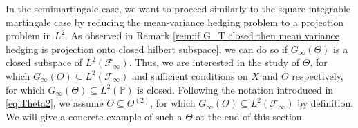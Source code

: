 \documentclass[11pt,a4paper,twoside,openany]{report}
\numberwithin{equation}{section}
\theoremstyle{plain} %
\theoremstyle{definition} %
\theoremstyle{remark} %
\begin{document}
In the semimartingale case, we want to proceed similarly to the square-integrable martingale case by reducing the mean-variance hedging problem to a projection problem in \(L^2\). As observed in Remark \ref{rem:if G_T closed then mean variance hedging is projection onto closed hilbert subspace}, we can do so if \(G_{\infty}(\Theta)\) is a closed subspace of  \(L^2(\mathcal{F}_{\infty})\). Thus, we are interested in the study of \(\Theta\), for which \(G_{\infty}(\Theta)\subseteq L^2(\mathcal{F}_{\infty})\) and sufficient conditions on \(X\) and \(\Theta\) respectively, for which \(G_{\infty}(\Theta)\subseteq L^2(\mathbb{P})\) is closed. Following the notation introduced in \eqref{eq:Theta2}, we assume \(\Theta\subseteq\Theta^{(2)}\), for which \(G_{\infty}(\Theta)\subseteq L^2(\mathcal{F}_{\infty})\) by definition. We will give a concrete example of such a \(\Theta\) at the end of this section.
\end{document}
